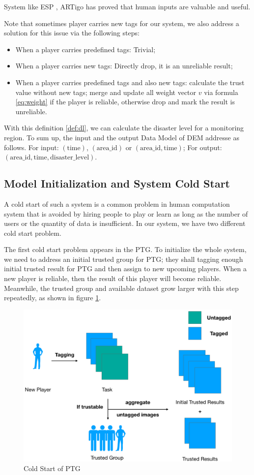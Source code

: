 System like ESP \cite{von2004labeling}, ARTigo \cite{wieser2013artigo} has proved that 
human inputs are valuable and useful.

Note that sometimes player carries new tags for our system, we also address a solution 
for this issue via the following steps:

\begin{itemize}
\item When a player carries predefined tags: Trivial;
\item When a player carries new tags: Directly drop, it is an unreliable result;
\item When a player carries predefined tags and also new tags: calculate the trust value without new tags;
  merge and update all weight vector $v$ via formula \ref{eq:weight} if the player is reliable, 
  otherwise drop and mark the result is unreliable.
\end{itemize}

With this definition \ref{def:dl}, we can calculate the disaster level for a monitoring region.
To sum up, the input and the output Data Model of DEM addresse as follows. For input:
$(\text{time})$, $(\text{area\_id})$ or $(\text{area\_id}, \text{time})$; For output:
$(\text{area\_id}, \text{time}, \text{disaster\_level})$.

\subsection{Model Initialization and System Cold Start}

A cold start of such a system is a common problem in human computation system that 
is avoided by hiring people to play or learn as long as 
the number of users or the quantity of data is insufficient.
In our system, we have two different cold start problem.

The first cold start problem appears in the PTG. To initialize the whole system, we need to
address an initial trusted group for PTG; they shall tagging enough initial trusted result
for PTG and then assign to new upcoming players. When a new player is reliable,
then the result of this player will become reliable. Meanwhile, the trusted group and 
available dataset grow larger with this step repeatedly, as shown in figure \ref{fig:cold}.

\begin{figure}[htp]
\centering
\includegraphics[width=0.5\columnwidth]{figures/coldstart}
\caption{Cold Start of PTG}
\label{fig:cold}
\end{figure}

